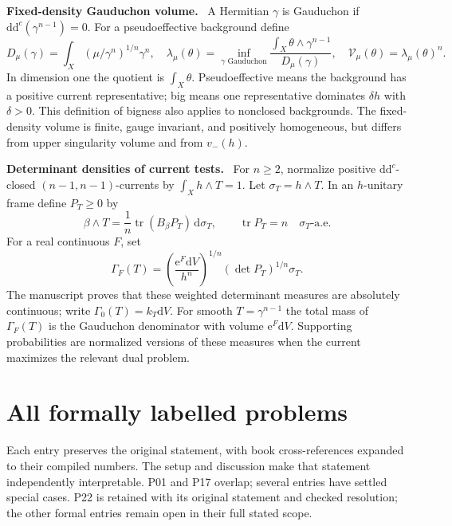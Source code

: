 \documentclass[11pt]{article}
\newcommand{\ddc}{\mathrm d\mathrm d^c}
\newcommand{\field}[1]{\par\medskip\noindent\textbf{#1.}\ }
\begin{document}
\field{Fixed-density Gauduchon volume}
A Hermitian $\gamma$ is Gauduchon if $\ddc(\gamma^{n-1})=0$. For a pseudoeffective background define
\[D_\mu(\gamma)=\int_X(\mu/\gamma^n)^{1/n}\gamma^n,\quad
\lambda_\mu(\theta)=\inf_{\gamma\text{ Gauduchon}}
\frac{\int_X\theta\wedge\gamma^{n-1}}{D_\mu(\gamma)},\quad
\mathcal V_\mu(\theta)=\lambda_\mu(\theta)^n.\]
In dimension one the quotient is $\int_X\theta$. Pseudoeffective means the background has a positive current representative; big means one representative dominates $\delta h$ with $\delta>0$. This definition of bigness also applies to nonclosed backgrounds. The fixed-density volume is finite, gauge invariant, and positively homogeneous, but differs from upper singularity volume and from $v_-(h)$.

\field{Determinant densities of current tests}
For $n\geq2$, normalize positive $\ddc$-closed $(n-1,n-1)$-currents by $\int_Xh\wedge T=1$. Let $\sigma_T=h\wedge T$. In an $h$-unitary frame define $P_T\geq0$ by
\[\beta\wedge T=\frac1n\operatorname{tr}(B_\beta P_T)\,\mathrm d\sigma_T,
\qquad\operatorname{tr}P_T=n\quad\sigma_T\text{-a.e.}\]
For a real continuous $F$, set
\[\Gamma_F(T)=\left(\frac{\mathrm e^F\mathrm dV}{h^n}\right)^{1/n}
(\det P_T)^{1/n}\sigma_T.\]
The manuscript proves that these weighted determinant measures are absolutely continuous; write $\Gamma_0(T)=k_T\mathrm dV$. For smooth $T=\gamma^{n-1}$ the total mass of $\Gamma_F(T)$ is the Gauduchon denominator with volume $\mathrm e^F\mathrm dV$. Supporting probabilities are normalized versions of these measures when the current maximizes the relevant dual problem.

\section{All formally labelled problems}
Each entry preserves the original statement, with book cross-references expanded to their compiled numbers. The setup and discussion make that statement independently interpretable. P01 and P17 overlap; several entries have settled special cases. P22 is retained with its original statement and checked resolution; the other formal entries remain open in their full stated scope.
\end{document}
